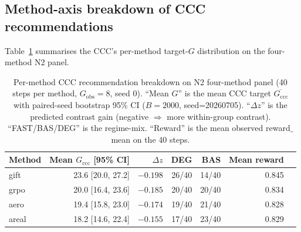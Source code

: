 %
%

\subsection*{Method-axis breakdown of CCC recommendations}

Table~\ref{tab:p7-method-axis-ccc} summarises the CCC's per-method
target-$G$ distribution on the four-method N2 panel.

\begin{table}[ht]
\centering\small
\caption{Per-method CCC recommendation breakdown on N2 four-method panel
(40 steps per method, $G_{\mathrm{obs}}{=}8$, seed 0).  ``Mean $G$''
is the mean CCC target $\overline{G_{\mathrm{ccc}}}$ with paired-seed
bootstrap 95\% CI ($B{=}2000$, seed=20260705).  ``$\Delta z$'' is the
predicted contrast gain (negative $\Rightarrow$ more within-group
contrast).  ``FAST/BAS/DEG'' is the regime-mix.  ``Reward'' is the
mean observed reward$\_$mean on the 40 steps.}
\label{tab:p7-method-axis-ccc}
\begin{tabular}{lrrrrrr}
\toprule
Method & Mean $G_{\mathrm{ccc}}$ [95\% CI] & $\Delta z$ & DEG & BAS & Mean reward \\
\midrule
gift  & 23.6 [20.0, 27.2] & $-0.198$ & 26/40 & 14/40 & 0.845 \\
grpo  & 20.0 [16.4, 23.6] & $-0.185$ & 20/40 & 20/40 & 0.834 \\
aero  & 19.4 [15.8, 23.0] & $-0.174$ & 19/40 & 21/40 & 0.828 \\
areal & 18.2 [14.6, 22.4] & $-0.155$ & 17/40 & 23/40 & 0.829 \\
\bottomrule
\end{tabular}
\end{table}

